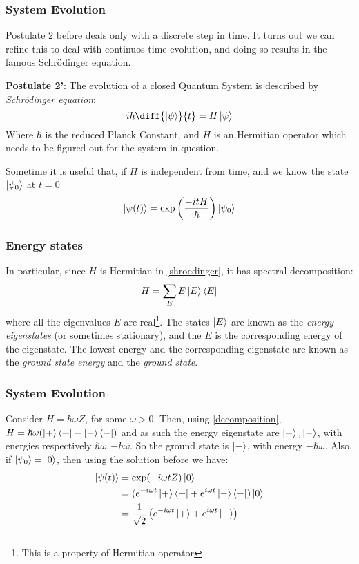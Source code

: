 \documentclass{beamer}
\begin{document}
\begin{frame}
    \frametitle{System Evolution}
    Postulate 2 before deals only with a discrete step in time. It turns out we can refine this to deal
    with continuos time evolution, and doing so results in the famous Schrödinger equation.
    \begin{definition}
        \textbf{Postulate 2'}:  The evolution of a closed Quantum System is described by \textit{Schrödinger equation}:
        \begin{equation}
            \label{shroedinger}
            i \hbar \diff{\ket{\psi}}{t} = H \ket{\psi}
        \end{equation}
        Where $\hbar$ is the reduced Planck Constant, and $H$ is an Hermitian operator which needs to
        be figured out for the system in question.
    \end{definition}
    Sometime it is useful that, if $H$ is independent from time, and we know the state $\ket{\psi_0}$ at $t = 0$
    \begin{equation}
        \ket{\psi(t)} = \exp\left(\frac{-itH}{\hbar}\right)\ket{\psi_0}
    \end{equation}
\end{frame}
\begin{frame}
    \frametitle{Energy states}
    In particular, since $H$ is Hermitian in \ref{shroedinger}, it has spectral decomposition:
    \begin{equation}
        H = \sum_E E \ket{E}\bra{E}
    \end{equation}
    where all the eigenvalues $E$ are real\footnote{This is a property of Hermitian operator}.
    The states $\ket{E}$ are known as the \textit{energy eigenstates} (or sometimes stationary), and the $E$ is the corresponding
    energy of the eigenstate. The lowest energy and the corresponding eigenstate are known as the \textit{ground state energy} and the \textit{ground state}.
\end{frame}
\begin{frame}
    \frametitle{System Evolution}
    \begin{example}
        Consider $H = \hbar \omega Z$, for some $\omega > 0$. Then, using \ref{decomposition}, $H = \hbar \omega (\ket{+}\bra{+} - \ket{-}\bra{-})$
        and as such the energy eigenstate are $\ket{+}, \ket{-}$, with energies respectively $\hbar \omega, -\hbar\omega$.
        So the ground state is $\ket{-}$, with energy $-\hbar\omega$.
        Also, if $\ket{\psi_0} = \ket{0}$, then using the solution before we have:
        \begin{align}
            \ket{\psi(t)} & = \exp(-i \omega t Z)\ket{0}                                                       \\
                          & = (e^{-i \omega t} \ket{+}\bra{+} + e^{i \omega t} \ket{-}\bra{-})\ket{0}          \\
                          & = \frac{1}{\sqrt{2}} \left(e^{-i \omega t} \ket{+} + e^{i \omega t} \ket{-}\right)
        \end{align}
    \end{example}
\end{frame}
\end{document}
